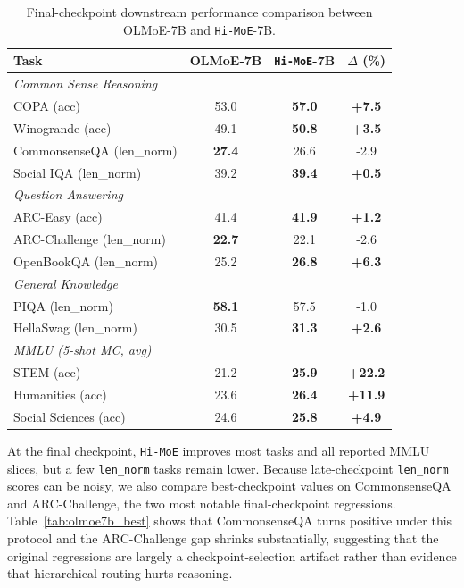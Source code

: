 \documentclass[sigconf,nonacm]{acmart}
\begin{document}
\begin{table}[!htbp]
\centering
\caption{Final-checkpoint downstream performance comparison between OLMoE-7B and \texttt{Hi-MoE}-7B.}
\label{tab:olmoe7b_downstream}
\setlength{\tabcolsep}{2pt}
\begin{tabular}{lccc}
\toprule
\textbf{Task} & \textbf{OLMoE-7B} & \textbf{\texttt{Hi-MoE}-7B} & \textbf{$\Delta$ (\%)} \\
\midrule
\multicolumn{4}{l}{\textit{Common Sense Reasoning}} \\
\midrule
COPA (acc)                  & 53.0 & \textbf{57.0} & \textbf{+7.5}  \\
Winogrande (acc)            & 49.1 & \textbf{50.8} & \textbf{+3.5}  \\
CommonsenseQA (len\_norm)   & \textbf{27.4} & 26.6 & -2.9 \\
Social IQA (len\_norm)      & 39.2 & \textbf{39.4} & \textbf{+0.5}  \\
\midrule
\multicolumn{4}{l}{\textit{Question Answering}} \\
\midrule
ARC-Easy (acc)              & 41.4 & \textbf{41.9} & \textbf{+1.2}  \\
ARC-Challenge (len\_norm)   & \textbf{22.7} & 22.1 & -2.6 \\
OpenBookQA (len\_norm)      & 25.2 & \textbf{26.8} & \textbf{+6.3}  \\
\midrule
\multicolumn{4}{l}{\textit{General Knowledge}} \\
\midrule
PIQA (len\_norm)            & \textbf{58.1} & 57.5 & -1.0 \\
HellaSwag (len\_norm)       & 30.5 & \textbf{31.3} & \textbf{+2.6}  \\
\midrule
\multicolumn{4}{l}{\textit{MMLU (5-shot MC, avg)}} \\
\midrule
STEM (acc)                         & 21.2 & \textbf{25.9} & \textbf{+22.2} \\
Humanities (acc)      
& 23.6 & \textbf{26.4} & \textbf{+11.9} \\
Social Sciences (acc)              & 24.6 & \textbf{25.8} & \textbf{+4.9}  \\
\bottomrule
\end{tabular}
\end{table}
At the final checkpoint, \texttt{Hi-MoE} improves most tasks and all reported MMLU slices, but a few \texttt{len\_norm} tasks remain lower. Because late-checkpoint \texttt{len\_norm} scores can be noisy, we also compare best-checkpoint values on CommonsenseQA and ARC-Challenge, the two most notable final-checkpoint regressions. Table~\ref{tab:olmoe7b_best} shows that CommonsenseQA turns positive under this protocol and the ARC-Challenge gap shrinks substantially, suggesting that the original regressions are largely a checkpoint-selection artifact rather than evidence that hierarchical routing hurts reasoning.
\end{document}
